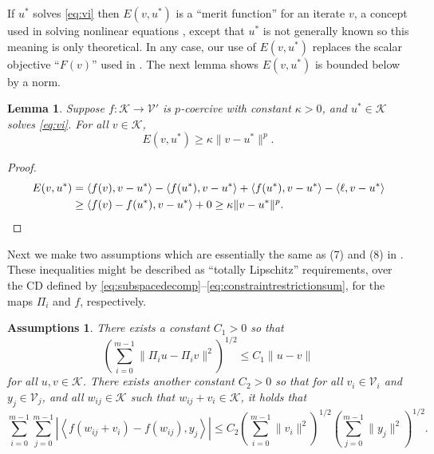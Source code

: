 \documentclass[letterpaper,final,12pt,reqno]{amsart}
\theoremstyle{cstyle}
\newtheorem{lemma}[theorem]{Lemma}
\theoremstyle{cstyle*}
\newtheorem{assumptions*}{Assumptions}
\theoremstyle{dstyle}
\numberwithin{equation}{section}
\numberwithin{figure}{section}
\numberwithin{table}{section}
\numberwithin{theorem}{section}
\newcommand{\cK}{\mathcal{K}}
\newcommand{\cV}{\mathcal{V}}
\newcommand{\ip}[2]{\left<#1,#2\right>}
\begin{document}
If $u^*$ solves \eqref{eq:vi} then $E(v,u^*)$ is a ``merit function'' for an iterate $v$, a concept used in solving nonlinear equations \cite{NocedalWright2006}, except that $u^*$ is not generally known so this meaning is only theoretical.  In any case, our use of $E(v,u^*)$ replaces the scalar objective ``$F(v)$'' used in \cite{Tai2003}.  The next lemma shows $E(v,u^*)$ is bounded below by a norm.

\begin{lemma} \label{lem:normlike}  Suppose $f:\mathcal{K} \to \mathcal{V}'$ is $p$-coercive with constant $\kappa>0$, and $u^* \in \mathcal{K}$ solves \eqref{eq:vi}.  For  all $v \in \mathcal{K}$,
\begin{equation}
  E(v,u^*) \ge \kappa \|v-u^*\|^p.  \label{eq:normlikebound}
\end{equation}
\end{lemma}

\begin{proof}
\begin{align*}
E(v,u^*) &= \ip{f(v)}{v-u^*} - \ip{f(u^*)}{v-u^*} + \ip{f(u^*)}{v-u^*} - \ip{\ell}{v-u^*} \\
   &\ge \ip{f(v)-f(u^*)}{v-u^*} + 0 \ge \kappa \|v-u^*\|^p.  \qedhere
\end{align*}
\end{proof}

Next we make two assumptions which are essentially the same as (7) and (8) in \cite{Tai2003}.  These inequalities might be described as ``totally Lipschitz'' requirements, over the CD defined by \eqref{eq:subspacedecomp}--\eqref{eq:constraintrestrictionsum}, for the maps $\Pi_i$ and $f$, respectively.

\begin{assumptions*}  There exists a constant $C_1>0$ so that
\begin{equation}
\left(\sum_{i=0}^{m-1} \|\Pi_i u - \Pi_i v\|^2\right)^{1/2} \le C_1 \|u-v\| \label{as:lipschitzrestrictions}
\end{equation}
for all $u,v\in\cK$.  There exists another constant $C_2>0$ so that for all $v_i \in \cV_i$ and $y_j \in \cV_j$, and all $w_{ij} \in \cK$ such that $w_{ij} + v_i \in \cK$, it holds that
\begin{equation}
\sum_{i=0}^{m-1} \sum_{j=0}^{m-1} \left|\ip{f(w_{ij} + v_i) - f(w_{ij})}{y_j}\right| \le C_2 \left(\sum_{i=0}^{m-1} \|v_i\|^2\right)^{1/2} \left(\sum_{j=0}^{m-1} \|y_j\|^2\right)^{1/2}. \label{as:lipschitzresidual}
\end{equation}
\end{assumptions*}
\end{document}
